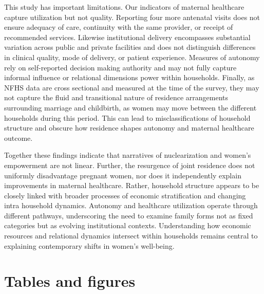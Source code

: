 \documentclass[12pt]{article}
\begin{document}
This study has important limitations. Our indicators of maternal healthcare capture utilization but not quality. Reporting four more antenatal visits does not ensure adequacy of care, continuity with the same provider, or receipt of recommended services. Likewise institutional delivery encompasses substantial variation across public and private facilities and does not distinguish differences in clinical quality, mode of delivery, or patient  experience. Measures of autonomy rely on self-reported decision making authority and may not fully capture informal influence or relational dimensions power within households.  Finally, as NFHS data are cross sectional and measured at the time of the survey, they may not capture the fluid and transitional nature of residence arrangements surrounding marriage and childbirth, as women may move between the different households during this period. This can lead to misclassifications of household structure and obscure how residence shapes autonomy and maternal healthcare outcome.

Together these findings indicate that narratives of nuclearization and women’s empowerment are not linear. Further, the resurgence of joint residence does not uniformly disadvantage pregnant women, nor does it independently explain improvements in maternal healthcare. Rather, household structure appears to be closely linked with broader processes of economic stratification and changing intra household dynamics. Autonomy and healthcare utilization operate through different pathways, underscoring the need to examine family forms not as fixed categories but as evolving institutional contexts. Understanding how economic resources and relational dynamics intersect within households remains central to explaining contemporary shifts in women’s well-being. 

\section{Tables and figures}
\end{document}
